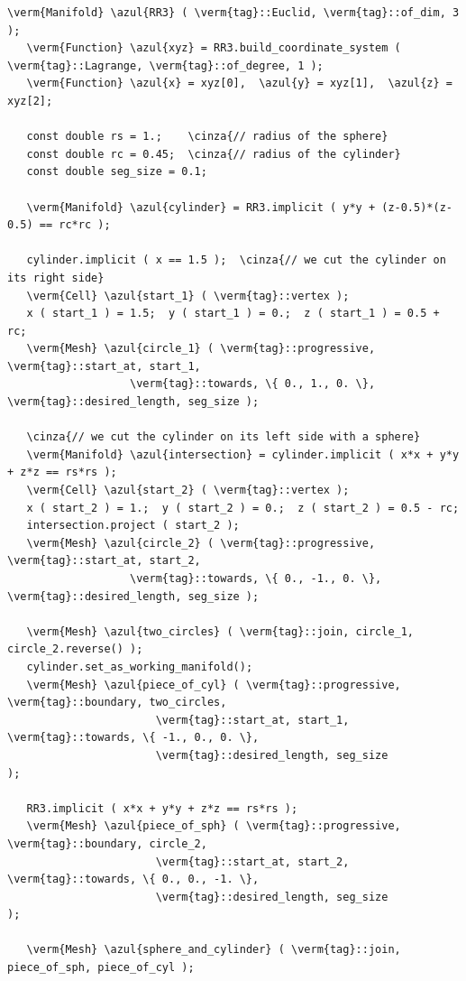 \begin{Verbatim}[commandchars=\\\{\},formatcom=\small\tt,frame=single,
   label=parag-\ref{\numb section 3.\numb parag 18}.cpp,rulecolor=\color{coment},
   baselinestretch=0.94,framesep=2mm                                            ]
   \verm{Manifold} \azul{RR3} ( \verm{tag}::Euclid, \verm{tag}::of_dim, 3 );
   \verm{Function} \azul{xyz} = RR3.build_coordinate_system ( \verm{tag}::Lagrange, \verm{tag}::of_degree, 1 );
   \verm{Function} \azul{x} = xyz[0],  \azul{y} = xyz[1],  \azul{z} = xyz[2];

   const double rs = 1.;    \cinza{// radius of the sphere}
   const double rc = 0.45;  \cinza{// radius of the cylinder}
   const double seg_size = 0.1;

   \verm{Manifold} \azul{cylinder} = RR3.implicit ( y*y + (z-0.5)*(z-0.5) == rc*rc );

   cylinder.implicit ( x == 1.5 );  \cinza{// we cut the cylinder on its right side}
   \verm{Cell} \azul{start_1} ( \verm{tag}::vertex );
   x ( start_1 ) = 1.5;  y ( start_1 ) = 0.;  z ( start_1 ) = 0.5 + rc;
   \verm{Mesh} \azul{circle_1} ( \verm{tag}::progressive, \verm{tag}::start_at, start_1,
                   \verm{tag}::towards, \{ 0., 1., 0. \}, \verm{tag}::desired_length, seg_size );

   \cinza{// we cut the cylinder on its left side with a sphere}
   \verm{Manifold} \azul{intersection} = cylinder.implicit ( x*x + y*y + z*z == rs*rs );
   \verm{Cell} \azul{start_2} ( \verm{tag}::vertex );
   x ( start_2 ) = 1.;  y ( start_2 ) = 0.;  z ( start_2 ) = 0.5 - rc;
   intersection.project ( start_2 );
   \verm{Mesh} \azul{circle_2} ( \verm{tag}::progressive, \verm{tag}::start_at, start_2,
                   \verm{tag}::towards, \{ 0., -1., 0. \}, \verm{tag}::desired_length, seg_size );

   \verm{Mesh} \azul{two_circles} ( \verm{tag}::join, circle_1, circle_2.reverse() );
   cylinder.set_as_working_manifold();
   \verm{Mesh} \azul{piece_of_cyl} ( \verm{tag}::progressive, \verm{tag}::boundary, two_circles,
                       \verm{tag}::start_at, start_1, \verm{tag}::towards, \{ -1., 0., 0. \},
                       \verm{tag}::desired_length, seg_size                          );

   RR3.implicit ( x*x + y*y + z*z == rs*rs );
   \verm{Mesh} \azul{piece_of_sph} ( \verm{tag}::progressive, \verm{tag}::boundary, circle_2,
                       \verm{tag}::start_at, start_2, \verm{tag}::towards, \{ 0., 0., -1. \},
                       \verm{tag}::desired_length, seg_size                         );
                       
   \verm{Mesh} \azul{sphere_and_cylinder} ( \verm{tag}::join, piece_of_sph, piece_of_cyl );
\end{Verbatim}


